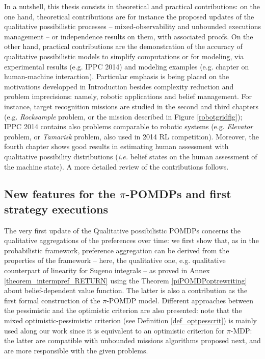 In a nutshell, 
this thesis consists in
theoretical and practical contributions:
on the one hand, theoretical contributions 
are for instance 
the proposed updates of the qualitative possibilistic processes
-- mixed-observability and unbounded executions management -- 
or independence results on them, with associated proofs.
On the other hand, 
practical contributions
are the demonstration of the accuracy 
of qualitative possibilistic models
to simplify computations or for modeling,
via experimental results (e.g. IPPC 2014) 
and modeling examples (e.g. chapter on human-machine interaction).
Particular emphasis is being placed 
on the motivations developped in Introduction
besides complexity reduction and problem imprecisions:
namely, robotic applications and belief management.
For instance, target recognition missions 
are studied in the second and third chapters 
(e.g. \textit{Rocksample} problem, or the mission described in Figure \ref{robotgridfig});
IPPC 2014 contains also problems comparable to robotic systems 
(e.g. \textit{Elevator} problem, or \textit{Tamarisk} problem, also used in 2014 RL competition). 
Moreover, the fourth chapter shows good results 
in estimating human assessment with qualitative possibility distributions
(\textit{i.e.} belief states on the human assessment of the machine state).
A more detailed review of the contributions follows.


\subsection*{New features for the $\pi$-POMDPs
and first strategy executions}
The very first update 
of the Qualitative possibilistic POMDPs \cite{Sabbadin:1999:pipomdp} 
concerns the qualitative aggregations 
of the preferences over time:
we first show that, 
as in the probabilistic framework,
preference aggregation can be derived 
from the properties of the framework 
-- here, the qualitative one, 
e.g. qualitative counterpart of linearity for Sugeno integrals --
as proved in Annex \ref{theorem_intermpref_RETURN} 
using the Theorem \ref{piPOMDPoptrewriting} 
about belief-dependent value function.
The latter is also a contribution 
as the first formal construction
of the $\pi$-POMDP model.
Different approaches between the pessimistic and the optimistic criterion
are also presented: 
note that the mixed optimistic-pessimistic criterion 
(see Definition \ref{def_optpesscrit}) 
is mainly used along our work 
since it is equivalent to 
an optimistic criterion for $\pi$-MDP:
the latter are compatible 
with unbounded missions algorithms proposed next,
and are more responsible with the given problems.

